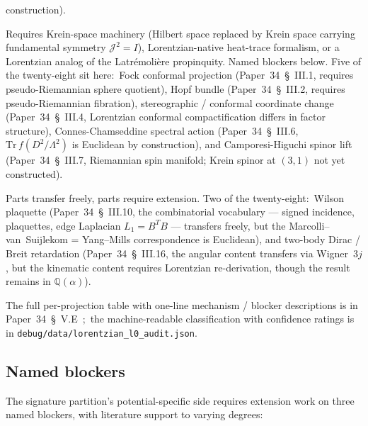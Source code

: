 \documentclass[twocolumn,pra,amsmath,amssymb,superscriptaddress]{revtex4-2}
\begin{document}
\begin{description}
  construction).
\item[\textsc{euclidean specific}.]  Requires Krein-space machinery
  (Hilbert space replaced by Krein space carrying fundamental symmetry
  $\mathcal{J}^2 = I$), Lorentzian-native heat-trace formalism, or a
  Lorentzian analog of the Latr\'emoli\`ere propinquity.  Named
  blockers below.  Five of the twenty-eight sit here:\ Fock conformal
  projection (Paper~34~\S~III.1, requires pseudo-Riemannian sphere
  quotient), Hopf bundle (Paper~34~\S~III.2, requires pseudo-Riemannian
  fibration), stereographic / conformal coordinate change
  (Paper~34~\S~III.4, Lorentzian conformal compactification differs in
  factor structure), Connes-Chamseddine spectral action
  (Paper~34~\S~III.6, $\mathrm{Tr}\,f(D^2/\Lambda^2)$ is Euclidean by
  construction), and Camporesi-Higuchi spinor lift
  (Paper~34~\S~III.7, Riemannian spin manifold; Krein spinor at $(3,1)$
  not yet constructed).
\item[\textsc{mixed}.]  Parts transfer freely, parts require extension.
  Two of the twenty-eight:\ Wilson plaquette
  (Paper~34~\S~III.10, the combinatorial vocabulary --- signed
  incidence, plaquettes, edge Laplacian $L_1 = B^T B$ --- transfers
  freely, but the Marcolli--van~Suijlekom = Yang--Mills correspondence
  is Euclidean), and two-body Dirac / Breit retardation
  (Paper~34~\S~III.16, the angular content transfers via Wigner~$3j$,
  but the kinematic content requires Lorentzian re-derivation, though
  the result remains in $\mathbb{Q}(\alpha)$).
\end{description}

The full per-projection table with one-line mechanism / blocker
descriptions is in Paper~34~\S~V.E~\cite{paper34};\ the
machine-readable classification with confidence ratings is in
\texttt{debug/data/lorentzian\_l0\_audit.json}.

\subsection{Named blockers}
\label{sec:sig_blockers}

The signature partition's potential-specific side requires extension
work on three named blockers, with literature support to varying
degrees:
\end{document}
